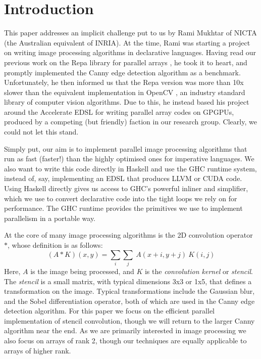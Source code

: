 
\section{Introduction}

This paper addresses an implicit challenge put to us by Rami Mukhtar of NICTA (the Australian equivalent of INRIA). At the time, Rami was starting a project on writing image processing algorithms in declarative languages. Having read our previous work on the Repa library for parallel arrays \cite{Keller:repa}, he took it to heart, and promptly implemented the Canny edge detection algorithm \cite{Canny:finding-edges-and-lines} as a benchmark. Unfortunately, he then informed us that the Repa version was more than 10x slower than the equivalent implementation in OpenCV \cite{bradski:opencv}, an industry standard library of computer vision algorithms. Due to this, he instead based his project around the Accelerate EDSL \cite{Chakravarty:accelerate} for writing parallel array codes on \mbox{GPGPUs}, produced by a competing (but friendly) faction in our research group. Clearly, we could not let this stand.

Simply put, our aim is to implement parallel image processing algorithms that run as fast (faster!) than the highly optimised ones for imperative languages. We also want to write this code directly in Haskell and use the GHC runtime system, instead of, say, implementing an EDSL that produces LLVM or CUDA code. Using Haskell directly gives us access to GHC's powerful inliner and simplifier, which we use to convert declarative code into the tight loops we rely on for performance. The GHC runtime provides the primitives we use to implement parallelism in a portable way.

At the core of many image processing algorithms is the 2D convolution operator $*$, whose definition is as follows:
$$(A * K) (x, y) = \sum_i \sum_j ~ A(x + i, y + j) ~ K(i, j)$$
Here, $A$ is the image being processed, and $K$ is the \emph{convolution kernel} or \emph{stencil}. The \emph{stencil} is a small matrix, with typical dimensions 3x3 or 1x5, that defines a transformation on the image. Typical transformations include the Gaussian blur, and the Sobel differentiation operator, both of which are used in the Canny edge detection algorithm. For this paper we focus on the efficient parallel implementation of stencil convolution, though we will return to the larger Canny algorithm near the end. As we are primarily interested in image processing we also focus on arrays of rank 2, though our techniques are equally applicable to arrays of higher rank.

